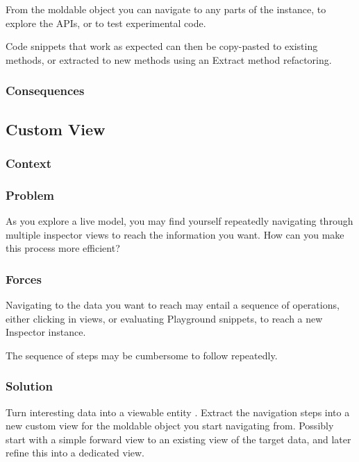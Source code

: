 \documentclass[sigconf]{acmart}
\begin{document}
From the moldable object you can navigate to any parts of the instance, to explore the APIs, or to test experimental code.

Code snippets that work as expected can then be copy-pasted to existing methods, or extracted to new methods using an Extract method refactoring.


\subsubsection*{Consequences}

\subsection*{Custom View}\label{pat:customView}
\subsubsection*{Context}
\subsubsection*{Problem}

As you explore a live model, you may find yourself repeatedly navigating through multiple inspector views to reach the information you want. How can you make this process more efficient?

\subsubsection*{Forces}

Navigating to the data you want to reach may entail a sequence of operations, either clicking in views, or evaluating Playground snippets, to reach a new Inspector instance.

The sequence of steps may be cumbersome to follow repeatedly.

\subsubsection*{Solution}

Turn interesting data into a viewable entity . Extract the navigation steps into a new custom view for the moldable object you start navigating from. Possibly start with a simple forward view to an existing view of the target data, and later refine this into a dedicated view.
\end{document}
